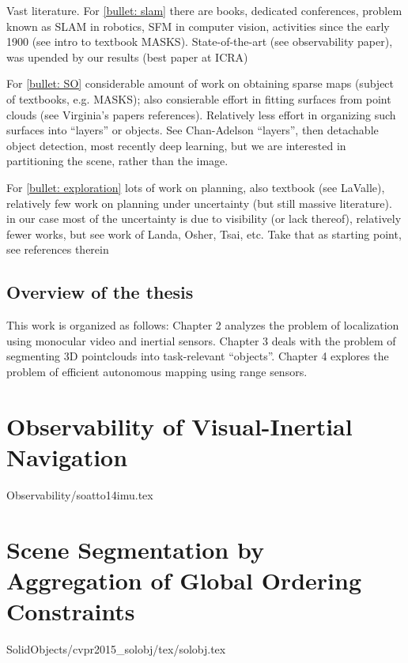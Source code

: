 \documentclass [PhD] {uclathes}
\begin{document}
\begin{enumerate}
Vast literature. For \ref{bullet: slam} there are books, dedicated conferences, problem known as SLAM in robotics, SFM in computer vision, activities since the early 1900 (see intro to textbook MASKS). State-of-the-art (see observability paper), was upended by our results (best paper at ICRA)

For \ref{bullet: SO} considerable amount of work on obtaining sparse maps (subject of textbooks, e.g. MASKS); also consierable effort in fitting surfaces from point clouds (see Virginia's papers references). Relatively less effort in organizing such surfaces into ``layers'' or objects. See Chan-Adelson ``layers'', then detachable object detection, most recently deep learning,  but we are interested in partitioning the scene, rather than the image.

For \ref{bullet: exploration} lots of work on planning, also textbook (see LaValle), relatively few work on planning under uncertainty (but still massive literature). in our case most of the uncertainty is due to visibility (or lack thereof), relatively fewer works, but see work of Landa, Osher, Tsai, etc. Take that as starting point, see references therein

\fi

\section{Overview of the thesis}
This work is organized as follows: Chapter 2 analyzes the problem of localization using monocular video and inertial sensors.
Chapter 3 deals with the problem of segmenting 3D pointclouds into task-relevant ``objects''.
Chapter 4 explores the problem of efficient autonomous mapping using range sensors.

\chapter{Observability of Visual-Inertial Navigation}
 {Observability/soatto14imu.tex}

\chapter{Scene Segmentation by Aggregation of Global Ordering Constraints}
 {SolidObjects/cvpr2015_solobj/tex/solobj.tex}


\end{enumerate}
\end{document}
